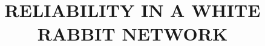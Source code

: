 \documentclass{../JAC2003}  %
\begin{document}
\title{RELIABILITY IN A WHITE RABBIT NETWORK}



\maketitle

























\end{document}
